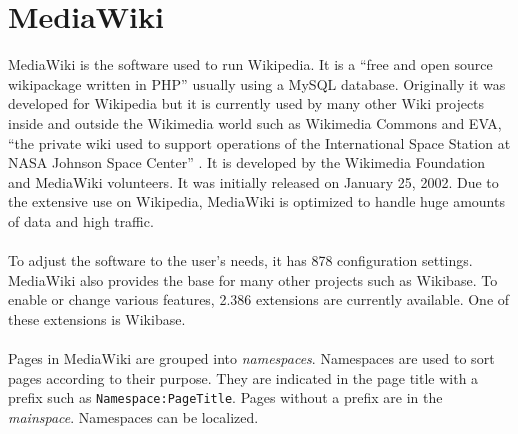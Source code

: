 \section{MediaWiki}

MediaWiki is the software used to run Wikipedia. It is a ``free and open source wikipackage written in PHP'' \citep{wiki:13} usually using a MySQL database. Originally it was developed for Wikipedia but it is currently used by many other Wiki projects inside and outside the Wikimedia world such as Wikimedia Commons and EVA, ``the private wiki used to support operations of the International Space Station at NASA Johnson Space Center'' \citep{eva-nasa}. It is developed by the Wikimedia Foundation and MediaWiki volunteers. It was initially released on January 25, 2002. \citep{wiki:13} Due to the extensive use on Wikipedia, MediaWiki is optimized to handle huge amounts of data and high traffic. \citep{wiki:14} \\
\\
To adjust the software to the user's needs, it has 878 configuration settings. \citep{wiki:15} \\
MediaWiki also provides the base for many other projects such as Wikibase.  To enable or change various features, 2.386 extensions are currently available. \citep{wiki:16} One of these extensions is Wikibase. \\
\\
Pages in MediaWiki are grouped into \textit{namespaces}. Namespaces are used to sort pages according to their purpose. They are indicated in the page title with a prefix such as \texttt{\justify Namespace:PageTitle}. Pages without a prefix are in the \textit{mainspace}. Namespaces can be localized. \citep{wiki:17}